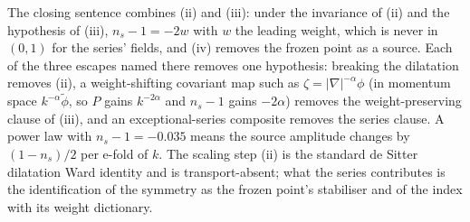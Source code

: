 The closing sentence combines (ii) and (iii): under the invariance of (ii) and the hypothesis of (iii), $n_{s} - 1 = -2w$ with $w$ the leading weight, which is never in $(0, 1)$ for the series' fields, and (iv) removes the frozen point as a source. Each of the three escapes named there removes one hypothesis: breaking the dilatation removes (ii), a weight-shifting covariant map such as $\zeta = |\nabla|^{-\alpha}\phi$ (in momentum space $k^{-\alpha}\tilde\phi$, so $P$ gains $k^{-2\alpha}$ and $n_{s} - 1$ gains $-2\alpha$) removes the weight-preserving clause of (iii), and an exceptional-series composite removes the series clause. A power law with $n_{s} - 1 = -0.035$ means the source amplitude changes by $(1 - n_{s})/2$ per e-fold of $k$. The scaling step (ii) is the standard de Sitter dilatation Ward identity and is transport-absent; what the series contributes is the identification of the symmetry as the frozen point's stabiliser and of the index with its weight dictionary.

